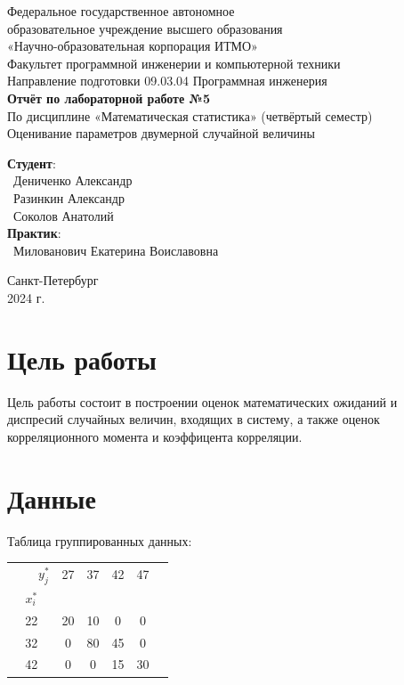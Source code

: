 \documentclass{article}
\begin{document}
\begin{center}
    \Large
    Федеральное государственное автономное \\
    образовательное учреждение высшего образования \\ 
    «Научно-образовательная корпорация ИТМО»\\
    \vspace{0.5cm}
    \large
    Факультет программной инженерии и компьютерной техники \\
    Направление подготовки 09.03.04 Программная инженерия \\
    \vspace{1cm}
    \Large
    \textbf{Отчёт по лабораторной работе №5} \\
    По дисциплине «Математическая статистика» (четвёртый семестр)\\
    Оценивание параметров двумерной случайной величины\\
    \large
    \vspace{8cm}

    \begin{minipage}{.33\textwidth}
    \end{minipage}
    \hfill
    \begin{minipage}{.4\textwidth}
    
        \textbf{Студент}: \vspace{.1cm} \\
        \ Дениченко Александр\\
        \ Разинкин Александр\\
        \ Соколов Анатолий\\
        \textbf{Практик}:  \\
        \ Милованович Екатерина Воиславовна
    \end{minipage}
    \vfill
Санкт-Петербург\\ 2024 г.
\end{center}
\thispagestyle{empty}

\newpage
\section*{Цель работы}
Цель работы состоит в построении оценок математических ожиданий и диспресий случайных величин, входящих в систему, а также оценок корреляционного момента и коэффицента корреляции.
\section*{Данные }
Таблица группированных данных:
\begin{table}[H]
    \centering
    \begin{tabular}{|c|c|c|c|c|c|}
    \hline
     \ \ \ \ $y_j^*$&  27&  37&  42& 47\\
    $x_i^*$&  &  &  & \\
    \hline
    22&  20&  10&  0& 0\\
    \hline
    32&  0&  80&  45& 0\\
    \hline
    42&  0&  0&  15& 30\\
    \hline
    \end{tabular}
\end{table}
\end{document}
